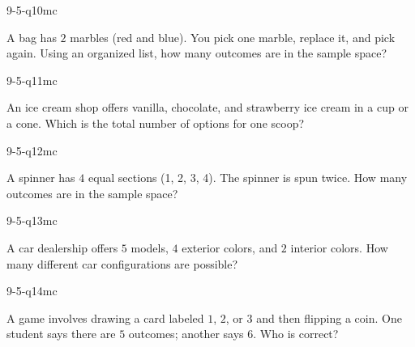 \begin{practiceQuestion}{9-5-q10}{mc}
\begin{questionText}
A bag has $2$ marbles (red and blue). You pick one marble, replace it, and pick again. Using an organized list, how many outcomes are in the sample space?
\end{questionText}
\end{practiceQuestion}

\begin{practiceQuestion}{9-5-q11}{mc}
\begin{questionText}
An ice cream shop offers vanilla, chocolate, and strawberry ice cream in a cup or a cone. Which is the total number of options for one scoop?
\end{questionText}
\end{practiceQuestion}

\begin{practiceQuestion}{9-5-q12}{mc}
\begin{questionText}
A spinner has $4$ equal sections (1, 2, 3, 4). The spinner is spun twice. How many outcomes are in the sample space?
\end{questionText}
\end{practiceQuestion}

\begin{practiceQuestion}{9-5-q13}{mc}
\begin{questionText}
A car dealership offers $5$ models, $4$ exterior colors, and $2$ interior colors. How many different car configurations are possible?
\end{questionText}
\end{practiceQuestion}

\begin{practiceQuestion}{9-5-q14}{mc}
\begin{questionText}
A game involves drawing a card labeled $1$, $2$, or $3$ and then flipping a coin. One student says there are $5$ outcomes; another says $6$. Who is correct?
\end{questionText}
\end{practiceQuestion}

